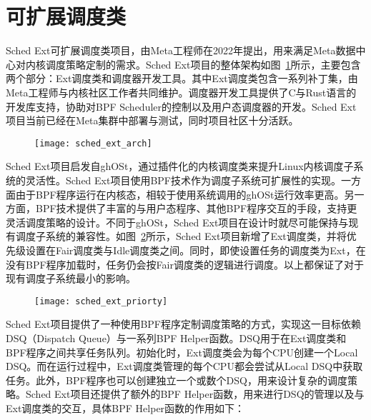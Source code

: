 \section{可扩展调度类}

Sched Ext可扩展调度类项目\citep{schedext}，由Meta工程师在2022年提出，用来满足Meta数据中心对内核调度策略定制的需求。Sched Ext项目的整体架构如图~\ref{fig:sched_ext_arch}所示，主要包含两个部分：Ext调度类和调度器开发工具。其中Ext调度类包含一系列补丁集，由Meta工程师与内核社区工作者共同维护。调度器开发工具提供了C与Rust语言的开发库支持，协助对BPF Scheduler的控制以及用户态调度器的开发。Sched Ext项目当前已经在Meta集群中部署与测试，同时项目社区十分活跃。

\begin{figure}[!htbp]
    \centering
    \texttt{[image: sched\_ext\_arch]}
    \label{fig:sched_ext_arch}
\end{figure}

Sched Ext项目启发自ghOSt\citep{humphries2021ghost}，通过插件化的内核调度类来提升Linux内核调度子系统的灵活性。Sched Ext项目使用BPF技术作为调度子系统可扩展性的实现。一方面由于BPF程序运行在内核态，相较于使用系统调用的ghOSt运行效率更高。另一方面，BPF技术提供了丰富的与用户态程序、其他BPF程序交互的手段，支持更灵活调度策略的设计。不同于ghOSt，Sched Ext项目在设计时就尽可能保持与现有调度子系统的兼容性。如图~\ref{fig:sched_ext_priorty}所示，Sched Ext项目新增了Ext调度类，并将优先级设置在Fair调度类与Idle调度类之间。同时，即使设置任务的调度类为Ext，在没有BPF程序加载时，任务仍会按Fair调度类的逻辑进行调度。以上都保证了对于现有调度子系统最小的影响。 

\begin{figure}[!htbp]
    \centering
    \texttt{[image: sched\_ext\_priorty]}
    \label{fig:sched_ext_priorty}
\end{figure}

Sched Ext项目提供了一种使用BPF程序定制调度策略的方式，实现这一目标依赖DSQ（Dispatch Queue）与一系列BPF Helper函数。DSQ用于在Ext调度类和BPF程序之间共享任务队列。初始化时，Ext调度类会为每个CPU创建一个Local DSQ。而在运行过程中，Ext调度类管理的每个CPU都会尝试从Local DSQ中获取任务。此外，BPF程序也可以创建独立一个或数个DSQ，用来设计复杂的调度策略。Sched Ext项目还提供了额外的BPF Helper函数，用来进行DSQ的管理以及与Ext调度类的交互，具体BPF Helper函数的作用如下：

